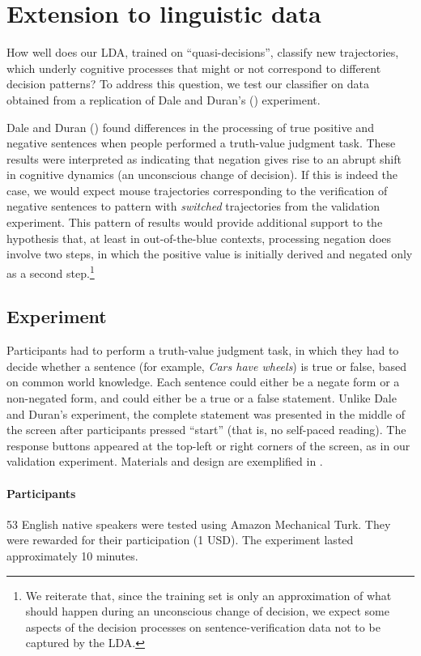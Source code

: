 \documentclass{article}
\begin{document}
\section{Extension to linguistic data}
\label{section:replication}
How well does our LDA, trained on “quasi-decisions”, classify new trajectories, which underly cognitive processes that might or not correspond to different decision patterns? To address this question, we test our classifier on data obtained from a replication of Dale and Duran's (\citeyear{Dale2011}) experiment.   
 
Dale and Duran (\citeyear{Dale2011}) found differences in the processing of true positive and negative sentences when people performed a truth-value judgment task. These results were interpreted as indicating that negation gives rise to an abrupt shift in cognitive dynamics (an unconscious change of decision). If this is indeed the case, we would expect mouse trajectories corresponding to the verification of negative sentences to pattern with \emph{switched} trajectories from the validation experiment. This pattern of results would provide additional support to the hypothesis that, at least in out-of-the-blue contexts, processing negation does involve two steps, in which the positive value is initially derived and negated only as a second step.\footnote{We reiterate that, since the training set is only an approximation of what should happen during an unconscious change of decision, we expect some aspects of the decision processes on sentence-verification data not to be captured by the LDA.}

\subsection{Experiment}
Participants had to perform a truth-value judgment task, in which they had to decide whether a sentence (for example, \textit{Cars have wheels}) is true or false, based on common world knowledge. Each sentence could either be a negate form or a non-negated form, and could either be a true or a false statement.
Unlike Dale and Duran's experiment, the complete statement was presented in the middle of the screen after participants pressed ``start'' (that is, no self-paced reading). The response buttons appeared at the top-left or right corners of the screen, as in our validation experiment.  
Materials and design are exemplified in . 

\paragraph{Participants}
53 English native speakers were tested using Amazon Mechanical Turk. They were rewarded for their participation (1 USD). The experiment lasted approximately 10 minutes. 
\end{document}
